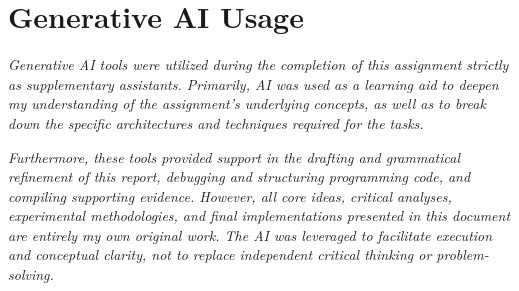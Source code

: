 \documentclass[11pt, a4paper]{article}
\begin{document}
\section*{Generative AI Usage}

\textit{Generative AI tools were utilized during the completion of this assignment strictly as supplementary assistants. Primarily, AI was used as a learning aid to deepen my understanding of the assignment's underlying concepts, as well as to break down the specific architectures and techniques required for the tasks.} 

\textit{Furthermore, these tools provided support in the drafting and grammatical refinement of this report, debugging and structuring programming code, and compiling supporting evidence. However, all core ideas, critical analyses, experimental methodologies, and final implementations presented in this document are entirely my own original work. The AI was leveraged to facilitate execution and conceptual clarity, not to replace independent critical thinking or problem-solving.}
\end{document}

